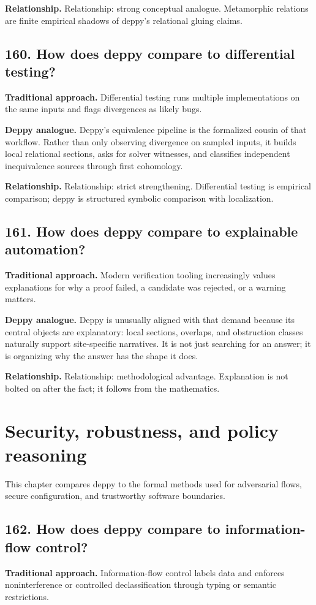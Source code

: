 \documentclass[11pt,openany]{book}
\begin{document}
\textbf{Relationship.} Relationship: strong conceptual analogue. Metamorphic relations are finite empirical shadows of deppy's relational gluing claims.

\section*{160. How does deppy compare to differential testing?}
\textbf{Traditional approach.} Differential testing runs multiple implementations on the same inputs and flags divergences as likely bugs.

\textbf{Deppy analogue.} Deppy's equivalence pipeline is the formalized cousin of that workflow. Rather than only observing divergence on sampled inputs, it builds local relational sections, asks for solver witnesses, and classifies independent inequivalence sources through first cohomology.

\textbf{Relationship.} Relationship: strict strengthening. Differential testing is empirical comparison; deppy is structured symbolic comparison with localization.

\section*{161. How does deppy compare to explainable automation?}
\textbf{Traditional approach.} Modern verification tooling increasingly values explanations for why a proof failed, a candidate was rejected, or a warning matters.

\textbf{Deppy analogue.} Deppy is unusually aligned with that demand because its central objects are explanatory: local sections, overlaps, and obstruction classes naturally support site-specific narratives. It is not just searching for an answer; it is organizing why the answer has the shape it does.

\textbf{Relationship.} Relationship: methodological advantage. Explanation is not bolted on after the fact; it follows from the mathematics.

\chapter{Security, robustness, and policy reasoning}
This chapter compares deppy to the formal methods used for adversarial flows, secure configuration, and trustworthy software boundaries.

\section*{162. How does deppy compare to information-flow control?}
\textbf{Traditional approach.} Information-flow control labels data and enforces noninterference or controlled declassification through typing or semantic restrictions.
\end{document}

